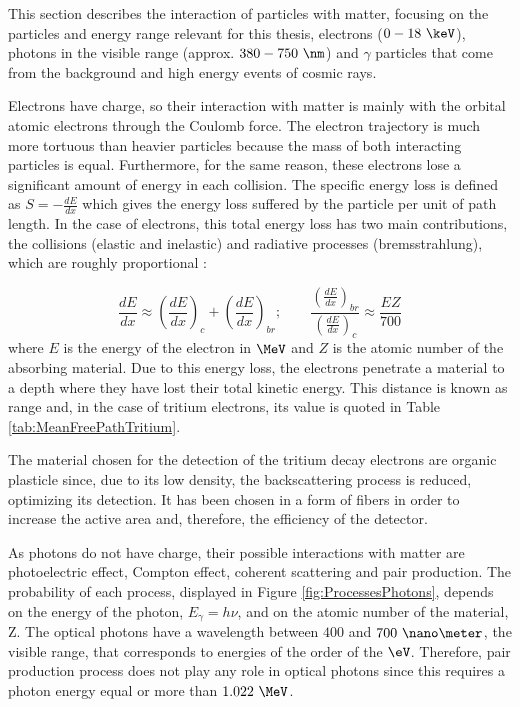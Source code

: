 This section describes the interaction of particles with matter, focusing on the particles and energy range relevant for this thesis, electrons ($0-18~\keV$), photons in the visible range (approx. $380-750~\nm$) and $\gamma$ particles that come from the background and high energy events of cosmic rays.

Electrons have charge, so their interaction with matter is mainly with the orbital atomic  electrons through the Coulomb force. The electron trajectory is much more tortuous than heavier particles because the mass of both interacting particles is equal. Furthermore, for the same reason, these electrons lose a significant amount of energy in each collision. The specific energy loss is defined as $S=-\displaystyle{\frac{dE}{dx}}$ which gives the energy loss suffered by the particle per unit of path length. In the case of electrons, this total energy loss has two main contributions, the collisions (elastic and inelastic) and radiative processes (bremsstrahlung), which are roughly proportional \cite{Knoll, Leo}:

\begin{equation}
\frac{dE}{dx} \approx \left(\frac{dE}{dx}\right)_{c} + \left(\frac{dE}{dx}\right)_{br} ; \qquad \frac{\displaystyle{\left(\frac{dE}{dx}\right)_{br}}}{\displaystyle{\left(\frac{dE}{dx}\right)_{c}}} \approx \frac{EZ}{700}
\label{eq:ElectronInteraction}
\end{equation}
where $E$ is the energy of the electron in $\MeV$ and $Z$ is the atomic number of the absorbing material. Due to this energy loss, the electrons penetrate a material to a depth where they have lost their total kinetic energy. This distance is known as range and, in the case of tritium electrons, its value is quoted in Table \ref{tab:MeanFreePathTritium}. 

The material chosen for the detection of the tritium decay electrons are organic plasticle since, due to its low density, the backscattering process is reduced, optimizing its detection. It has been chosen in a form of fibers in order to increase the active area and, therefore, the efficiency of the detector.

As photons do not have charge, their possible interactions with matter are photoelectric effect, Compton effect, coherent scattering and pair production. The probability of each process, displayed in Figure \ref{fig:ProcessesPhotons}, depends on the energy of the photon, $E_\gamma = h\nu$, and on the atomic number of the material, Z. The optical photons have a wavelength between $400$ and $700~\nano\meter$, the visible range, that corresponds to energies of the order of the $\eV$. Therefore, pair production process does not play any role in optical photons since this requires a photon energy equal or more than $1.022~\MeV$.

